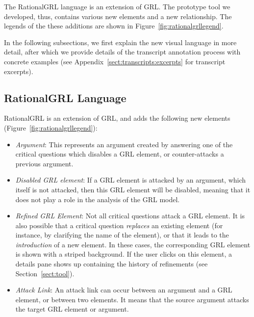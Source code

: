 The RationalGRL language is an extension of GRL. The prototype tool we developed, thus, contains various new elements and a new relationship. The legends of the these additions are shown in Figure~\ref{fig:rationalgrllegend}.

In the following subsections, we first explain the new visual language in more detail, after which we provide details of the transcript annotation process with concrete examples (see Appendix~\ref{sect:transcripts:excerpts} for transcript excerpts).

\subsection{RationalGRL Language}

RationalGRL is an extension of GRL, and adds the following new elements (Figure~\ref{fig:rationalgrllegend}):
\begin{itemize}
\item \emph{Argument}: This represents an argument created by answering one of the critical questions which disables a GRL element, or counter-attacks a previous argument. %
\item \emph{Disabled GRL element}: If a GRL element is attacked by an argument, which itself is not attacked, then this GRL element will be disabled, meaning that it does not play a role in the analysis of the GRL model. 
\item \emph{Refined GRL Element}: Not all critical questions attack a GRL element. It is also possible that a critical question \emph{replaces} an existing element (for instance, by clarifying the name of the element), or that it leads to the \emph{introduction} of a new element. In these cases, the corresponding GRL element is shown with a striped background. If the user clicks on this element, a details pane shows up containing the history of refinements (see Section~\ref{sect:tool}). %
\item \emph{Attack Link}: An attack link can occur between an argument and a GRL element, or between two elements. It means that the source argument attacks the target GRL element or argument.
\end{itemize} %

